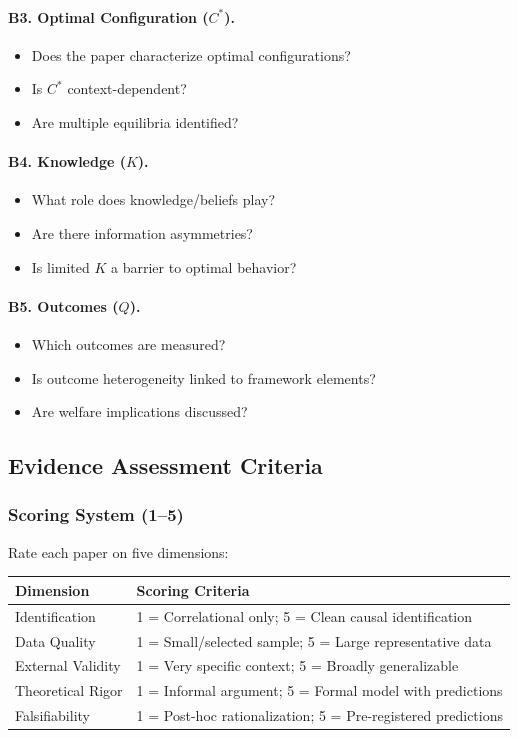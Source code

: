 \paragraph{B3. Optimal Configuration ($C^*$).}
\begin{itemize}
  \item Does the paper characterize optimal configurations?
  \item Is $C^*$ context-dependent?
  \item Are multiple equilibria identified?
\end{itemize}

\paragraph{B4. Knowledge ($K$).}
\begin{itemize}
  \item What role does knowledge/beliefs play?
  \item Are there information asymmetries?
  \item Is limited $K$ a barrier to optimal behavior?
\end{itemize}

\paragraph{B5. Outcomes ($Q$).}
\begin{itemize}
  \item Which outcomes are measured?
  \item Is outcome heterogeneity linked to framework elements?
  \item Are welfare implications discussed?
\end{itemize}

\subsection{Evidence Assessment Criteria}

\subsubsection{Scoring System (1--5)}

Rate each paper on five dimensions:

\begin{center}
\renewcommand{\arraystretch}{1.2}
\begin{tabular}{lp{9cm}}
\hline
\textbf{Dimension} & \textbf{Scoring Criteria} \\
\hline
Identification & 1 = Correlational only; 5 = Clean causal identification \\
Data Quality & 1 = Small/selected sample; 5 = Large representative data \\
External Validity & 1 = Very specific context; 5 = Broadly generalizable \\
Theoretical Rigor & 1 = Informal argument; 5 = Formal model with predictions \\
Falsifiability & 1 = Post-hoc rationalization; 5 = Pre-registered predictions \\
\hline
\end{tabular}
\end{center}

